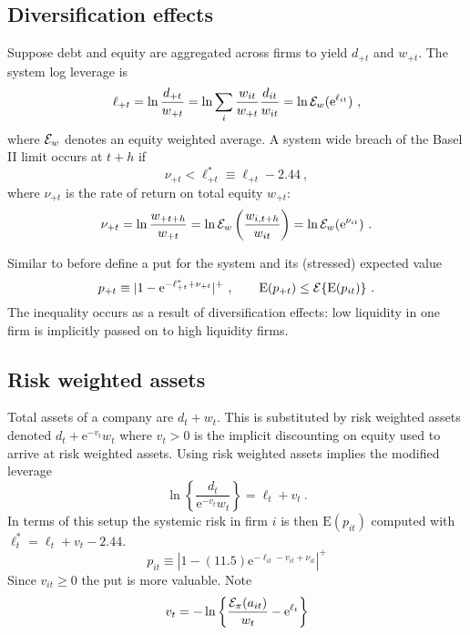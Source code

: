 \documentclass[authoryear]{elsarticle}
\newcommand{\E}{\mathrm{E}}
\newcommand{\e}{\mathrm{e}}
\newcommand{\Ex}{{\cal E}}
\newcommand{\cq}{\ , \qquad}
\newcommand{\be}[1]{\begin{equation}\label{#1}}
\newcommand{\ee}{\end{equation}}
\begin{document}
\subsection{Diversification effects} 

Suppose debt and equity are  aggregated across firms to yield $d_{+t}$ and $w_{+t}$.  The system log leverage is  
$$
\ell_{+t} =  \ln \frac{d_{+t}}{w_{+t}} =  \ln \sum_i\frac{w_{it}}{w_{+t}}\frac{ d_{it}}{ w_{it}} = \ln \Ex_w(\e^{\ell_{it}}) \ ,
$$
where $\Ex_w$ denotes an equity weighted average.  A system wide breach of the Basel II limit occurs at $t+h$ if
$$
\nu_{+t} < \ell_{+t}^*\equiv \ell_{+t} - 2.44 \ ,
$$
where $\nu_{+t}$ is the rate of return on total equity $w_{+t}$:
\be{ew}
 \nu_{+t} = \ln \frac{w_{+t+h}}{w_{+t}} = \ln \Ex_w\left(\frac{w_{i,t+h}}{w_{it}}\right) = \ln \Ex_w(\e^{\nu_{it}})\ . 
\ee

Similar to before define a put for the system and its (stressed) expected value
$$
p_{+t}\equiv |1-\e^{-\ell_{+t}^*+\nu_{+t}}|^+\cq \E(p_{+t})\le\Ex\{\E(p_{it})\}\ .
$$
The inequality occurs as a result  of diversification effects:   low liquidity  in one firm is implicitly passed on to high liquidity  firms.

\subsection{Risk weighted assets}

Total assets of a company are $d_{t}+w_{t}$.   This is substituted by risk weighted assets denoted $d_t+\e^{-v_t}w_t$ where $v_t>0$ is the implicit discounting on equity used to arrive at risk weighted assets.  
  Using risk weighted assets implies the modified leverage
$$
 \ln\left\{ \frac{d_t}{\e^{-v_t}w_t}\right\}=\ell_t +v_t\ .
$$
In terms of this setup the systemic risk in firm $i$ is then $\E(p_{it})$ computed with $\ell_t^*=\ell_t + v_t-2.44$.
$$
p_{it}\equiv  |1-(11.5)\e^{-\ell_{it}-v_{it}+\nu_{it}}|^+
$$
Since $v_{it}\ge 0$ the put is more valuable.   Note 
$$
v_t =-\ln\left\{ \frac{\Ex_\pi(a_{it})}{w_t} - \e^{\ell_t}\right\}
$$
\end{document}
